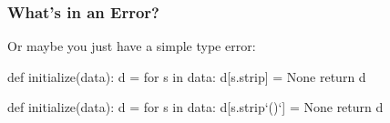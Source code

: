\documentclass[aspectratio=169, handout]{beamer}
\newcommand{\cmark}{{\color{green!80!black}\ding{51}}}
\newcommand{\xmark}{{\color{red}\ding{55}}}
\begin{document}
\begin{frame}[fragile]
  \frametitle{What's in an Error?}

  Or maybe you just have a simple type error:

  \pause
  \begin{center}
    \begin{minipage}[t][1.1in][t]{\textwidth}
      \begin{minipage}{0.2\textwidth}
        \centering
        \vspace{\fill}
        {\huge\xmark}
        \vspace{\fill}
      \end{minipage}
      \begin{minipage}{0.75\textwidth}
        {\small
          \begin{codeblock}[rulecolor=\color{red}, framerule=0.3mm, language=python]
            def initialize(data):
              d = {}
              for s in data:
                d[s.strip] = None
              return d
          \end{codeblock}
          }
        \end{minipage}
    \end{minipage}
    \pause
    \begin{minipage}[t][1.1in][t]{\textwidth}
      \begin{minipage}{0.2\textwidth}
        \centering
        \vspace{\fill}
        {\huge\cmark}
        \vspace{\fill}
      \end{minipage}
      \begin{minipage}{0.75\textwidth}
        {\small
        \begin{codeblock}[rulecolor=\color{green!80!black}, framerule=0.3mm, language=python]
            def initialize(data):
              d = {}
              for s in data:
                d[s.strip`()`] = None
              return d
        \end{codeblock}
        }
      \end{minipage}
    \end{minipage}
  \end{center}
\end{frame}
\end{document}
